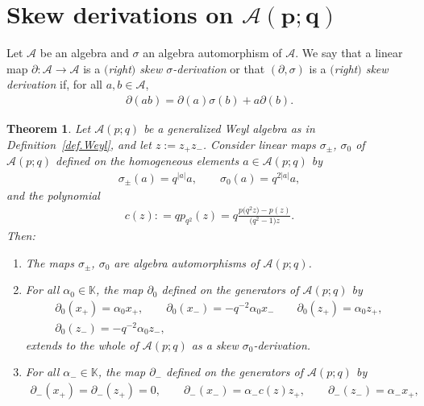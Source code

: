 \documentclass[pdftex]{sigma}
\numberwithin{equation}{section}
\newtheorem{Theorem}{Theorem}[section]
\def\AWeyl#1#2{{\mathcal{A}}(#1;#2)}
\begin{document}
\section[Skew derivations on ${\mathcal A}(p;q)$]{Skew derivations on $\boldsymbol{\AWeyl p q}$}\label{sec.skew}
Let ${\mathcal{A}}$ be an algebra and $\sigma$ an algebra automorphism of ${\mathcal{A}}$. We say that a linear map $\partial\colon {\mathcal{A}} \to {\mathcal{A}}$ is a {\em $($right$)$ skew $\sigma$-derivation} or that $(\partial, \sigma)$ is a {\em $($right$)$ skew derivation} if, for all $a,b\in {\mathcal{A}}$,
\begin{gather*}%
\partial(ab) = \partial(a) \sigma(b) + a\partial(b).
\end{gather*}

\begin{Theorem}\label{thm.skew}
Let $\AWeyl p q$ be a generalized Weyl algebra as in Definition~{\rm \ref{def.Weyl}}, and let $z:= z_+z_-$. Consider linear maps $\sigma_\pm$, $\sigma_0$ of $\AWeyl p q$ defined on the homogeneous elements $a\in \AWeyl p q$ by
\begin{gather}\label{sigma}
\sigma_\pm(a) = q^{|a|}a, \qquad \sigma_0(a) = q^{2|a|}a,
\end{gather}
and the polynomial
\begin{gather}\label{c}
c(z) : = q p _{q^2}(z) = q\frac{p\big(q^2z\big) -p(z)}{\big(q^2 -1\big)z}.
\end{gather}
Then:
\begin{enumerate}\itemsep=0pt
\item[$(1)$] The maps $\sigma_\pm$, $\sigma_0$ are algebra automorphisms of
$\AWeyl p q$.
\item[$(2)$] For all $\alpha_0 \in {\mathbb K}$, the map $\partial_0$ defined on the generators of $\AWeyl p q$ by
\begin{gather*}%
\partial_0(x_+) = \alpha_0 x_+, \qquad \partial_0(x_-) = -q^{-2}\alpha_0 x_-\qquad \partial_0(z_+) = \alpha_0 z_+, \\ \partial_0(z_-) = -q^{-2}\alpha_0 z_-,
\end{gather*}
extends to the whole of $\AWeyl p q$ as a skew $\sigma_0$-derivation.
\item[$(3)$] For all $\alpha_- \in {\mathbb K}$, the map $\partial_-$ defined on the generators of $\AWeyl p q$ by
\begin{gather*}%
\partial_-(x_+)=\partial_-(z_+) = 0, \qquad \partial_-(x_-) = \alpha_- c(z) z_+,\qquad \partial_-(z_-) = \alpha_- x_+,
\end{gather*}

\end{enumerate}
\end{Theorem}
\end{document}
